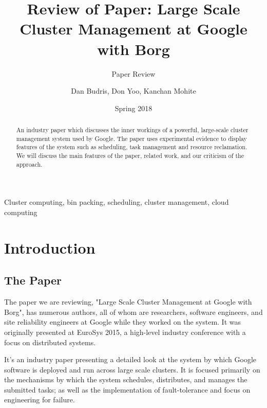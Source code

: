 \documentclass[runningheads,a4paper]{llncs}
\newcommand{\keywords}[1]{\par\addvspace\baselineskip
\noindent\keywordname\enspace\ignorespaces#1}
\begin{document}
\mainmatter

\title{Review of Paper: Large Scale Cluster Management at Google with Borg }
\subtitle{Paper Review }
\date{Spring 2018}

\author{Dan Budris, Don Yoo, Kanchan Mohite}


\maketitle
\begin{abstract}
An industry paper which discusses the inner workings of a powerful, large-scale cluster management system used by Google.  The paper uses experimental evidence to display features of the system such as scheduling, task management and resource reclamation.  We will discuss the main features of the paper, related work, and our criticism of the approach.
\end{abstract}

\keywords{Cluster computing, bin packing, scheduling, cluster management, cloud computing}

\section{Introduction}
\subsection{The Paper}
The paper we are reviewing, "Large Scale Cluster Management at Google with Borg",   has numerous authors, all of whom are researchers, software engineers, and site reliability engineers at Google while they worked on the system.  It was originally presented at EuroSys 2015, a high-level industry conference with a focus on distributed systems.  

It’s an industry paper presenting a detailed look at the system by which Google software is deployed and run across large scale clusters.  It is focused primarily on the mechanisms by which the system schedules, distributes, and manages the submitted tasks; as well as the implementation of fault-tolerance and focus on engineering for failure.
\end{document}
